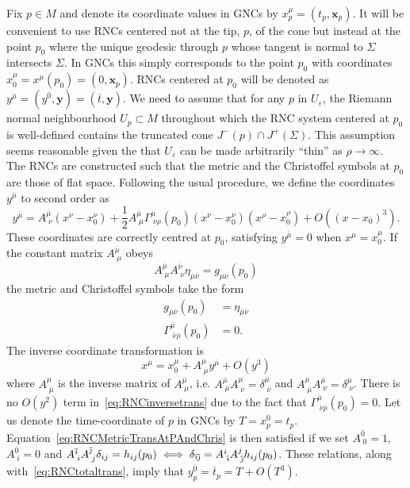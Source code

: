 \documentclass[12pt]{article}
\newcommand{\be}{\begin{equation}}
\newcommand{\ee}{\end{equation}}
\newcommand{\bea}{\begin{aligned}}
\newcommand{\eea}{\end{aligned}}
\newcommand{\mb}[1]{\marginnote{\texttt{\small MB:\,#1}}}
\newcommand{\ibar}{{\overline{\emph\i}}}
\newcommand{\jbar}{{\overline{\emph\j}}}
\begin{document}
Fix $p\in M$ and denote its coordinate values in GNCs by $x^\mu_p= (t_p,\mathbf x_p)$. It will be convenient to use RNCs centered not at the tip, $p$, of the cone but instead at the point $p_0$ where the unique geodesic through $p$ whose tangent is normal to $\Sigma$ intersects $\Sigma$. In GNCs this simply corresponds to the point $p_0$ with coordinates $x_0^\mu=x^\mu (p_0)= (0,\mathbf x_p)$. RNCs centered at $p_0$ will be denoted as $y^{\overline{\mu}}=(y^{\overline{0}},\mathbf{y})=(\overline{t},\mathbf{y})$.
We need to assume that for any $p$ in $U_\varepsilon$, the Riemann normal neighbourhood $U_p\subset M$ throughout which the RNC system centered at $p_0$ is well-defined contains the truncated cone $J^- (p)\cap J^+ (\Sigma)$. This assumption seems reasonable given the that $U_\varepsilon$ can be made arbitrarily ``thin'' as $\rho\rightarrow\infty$. The RNCs are constructed such that the metric and the Christoffel symbols at $p_0$ are those of flat space. Following the usual procedure, we define the coordinates $y^{\overline\mu}$ to second order as\mb{sign?}
\be\label{eq:RNCtotaltrans}
y^{\overline{\mu}}=A^{\overline{\mu}}_{\;\nu}(x^\nu -x_0^{\nu})+\frac{1}{2}A^{\overline{\mu}}_{\;\mu}\Gamma^{\mu}_{\;\nu\rho} (p_0)(x^\nu -x_0^{\nu}) (x^\rho -x_0^{\rho})+O ( (x-x_0)^3).
\ee
These coordinates are correctly centred at $p_0$, satisfying $y^{\overline{\mu}}=0$ when $x^{\mu}=x_0^{\mu}$. If the constant matrix $A^{\overline\mu}_{\;\mu}$ obeys 
\be\label{eq:RNCMetricTransAtPAndChris}
A^{\overline\mu}_{\;\mu} A^{\overline\nu}_{\;\nu}\eta_{\overline\mu\overline\nu}=g_{\mu\nu}(p_0)
\ee
the metric and Christoffel symbols take the form
\be\bea
g_{\overline{\mu} \overline{\nu}} (p_0)&=\eta_{\overline\mu\overline\nu}\\\Gamma^{\overline{\mu}}_{\;\overline{\nu}\overline{\rho}} (p_0)&=0.
\eea\ee
The inverse coordinate transformation is
\be\label{eq:RNCinversetrans}
x^{\mu}=x_0^{\mu}+A^{\mu}_{\;\overline{\mu}}y^{\overline{\mu}}+O (y^3)
\ee
where $A^{\mu}_{\;\overline{\mu}}$ is the inverse matrix of $A^{\overline\mu}_{\;{\mu}}$, i.e. $A^{\overline{\mu}}_{\;\mu}A^{\mu}_{\;\overline{\nu}}=\delta^{\overline{\mu}}_{\;\overline{\nu}}$ and $A^{\mu}_{\;\overline{\mu}}A^{\overline{\mu}}_{\;\nu}=\delta^{\mu}_{\;\nu}$. There is no $O(y^2)$ term in~\eqref{eq:RNCinversetrans} due to the fact that $\Gamma^{\overline{\mu}}_{\;\overline{\nu}\overline{\rho}} (p_0)=0$. Let us denote the time-coordinate of $p$ in GNCs by $T=x^0_p=t_p$. Equation~\eqref{eq:RNCMetricTransAtPAndChris} is then satisfied if we set $A^{\overline 0}_{\;0}=1$, $A^{\overline 0}_{\;i}=0$ and $A^{\ibar}_{\;i}A^{\jbar}_{\;j}\delta_{ij} =h_{ij}(p_0)\iff\delta_{\ibar\jbar}=A^i_{\;\ibar}A^j_{\;\jbar}h_{ij} (p_0)$. These relations, along with~\eqref{eq:RNCtotaltrans}, imply that $y^{\overline{0}}_p=\overline{t}_p=T+O(T^3)$.
\end{document}
